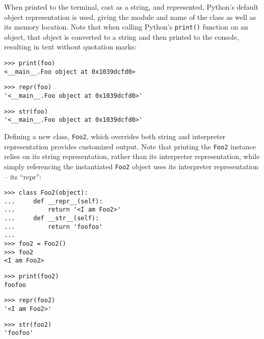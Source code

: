 \noindent When printed to the terminal, cast as a string, and represented,
Python's default object representation is used, giving the module and name of
the class as well as its memory location. Note that when calling Python's
\texttt{print()} function on an object, that object is converted to a string
and then printed to the console, resulting in text without quotation marks:

\begin{comment}
<abjad>
print(foo)
repr(foo)
str(foo)
</abjad>
\end{comment}

\begin{abjadbookoutput}
\begin{singlespacing}
\vspace{-0.5\baselineskip}
\begin{verbatim}
>>> print(foo)
<__main__.Foo object at 0x1039dcfd0>
\end{verbatim}
\begin{verbatim}
>>> repr(foo)
'<__main__.Foo object at 0x1039dcfd0>'
\end{verbatim}
\begin{verbatim}
>>> str(foo)
'<__main__.Foo object at 0x1039dcfd0>'
\end{verbatim}
\end{singlespacing}
\end{abjadbookoutput}

\noindent Defining a new class, \texttt{Foo2}, which overrides both string and
interpreter representation provides customized output. Note that printing the
\texttt{Foo2} instance relies on its string representation, rather than its
interpreter representation, while simply referencing the instantiated
\texttt{Foo2} object uses its interpreter representation -- its \enquote{repr}:

\begin{comment}
<abjad>
class Foo2(object):
    def __repr__(self):
        return '<I am Foo2>'
    def __str__(self):
        return 'foofoo'

foo2 = Foo2()
foo2
print(foo2)
repr(foo2)
str(foo2)
</abjad>
\end{comment}

\begin{abjadbookoutput}
\begin{singlespacing}
\vspace{-0.5\baselineskip}
\begin{verbatim}
>>> class Foo2(object):
...     def __repr__(self):
...         return '<I am Foo2>'
...     def __str__(self):
...         return 'foofoo'
...
>>> foo2 = Foo2()
>>> foo2
<I am Foo2>
\end{verbatim}
\begin{verbatim}
>>> print(foo2)
foofoo
\end{verbatim}
\begin{verbatim}
>>> repr(foo2)
'<I am Foo2>'
\end{verbatim}
\begin{verbatim}
>>> str(foo2)
'foofoo'
\end{verbatim}
\end{singlespacing}
\end{abjadbookoutput}

